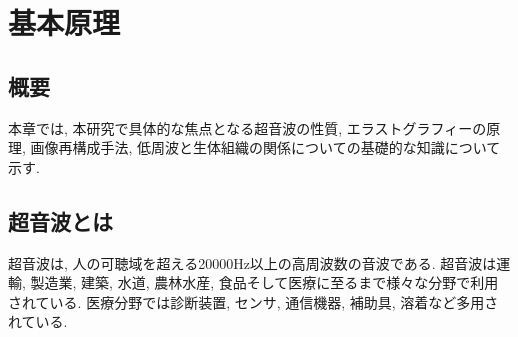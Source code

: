 \chapter{基本原理}
\newpage
\section{概要}
本章では, 本研究で具体的な焦点となる超音波の性質, エラストグラフィーの原理, 画像再構成手法, 低周波と生体組織の関係についての基礎的な知識について示す.

\section{超音波とは}
超音波は, 人の可聴域を超える20000Hz以上の高周波数の音波である. 超音波は運輸, 製造業, 建築, 水道, 農林水産, 食品そして医療に至るまで様々な分野で利用されている. 医療分野では診断装置, センサ, 通信機器, 補助具, 溶着など多用されている. 

